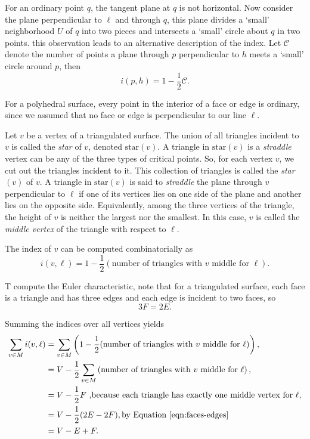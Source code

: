 For an ordinary point $q$, the tangent plane at $q$ is not horizontal. 
Now consider the plane perpendicular to $\ell$ and through $q$, this plane
divides a `small' neighborhood $U$ of $q$ into two pieces and intersects
a `small' circle about $q$ in two points.
this observation leads to an alternative description of the index.
Let $\mathcal{C}$ denote the number of points a plane through $p$ perpendicular
to $h$ meets a `small' circle around $p$, then 
$$i(p,h)=1-\frac{1}{2}\mathcal{C}.$$

For a  polyhedral surface, every point in the interior of a face or edge
is ordinary, since we assumed that no face or edge is perpendicular to our line $\ell.$

Let $v$ be a vertex of a triangulated surface.
The union of all triangles incident to $v$ is called the \emph{star} of $v$,
 denoted $\mathrm{star}(v).$ A triangle in $\mathrm{star}(v)$
 is a \emph{straddle}
 vertex can be any of the three types of critical points.
So, for each vertex $v$, we cut out the triangles incident to it. This collection of triangles
is called the \emph{star}$(v)$ of $v$. 
A triangle in $\mathrm{star}(v)$ is said to \emph{straddle} the plane through 
$v$ perpendicular to $\ell$ if one of its vertices lies on one side of the plane 
and another lies on the opposite side. Equivalently, among the three vertices 
of the triangle, the height of $v$ is neither the largest nor the smallest. 
In this case, $v$ is called the \emph{middle vertex} of the triangle with respect to $\ell$.

The index of $v$ can be computed combinatorially as
$$i(v,\ell)=1-\frac{1}{2} \left(\text{number of triangles with } v \text{ middle for } \ell\right).$$



T compute the Euler characteristic, note that for a triangulated surface, 
each face is a triangle and has three edges and each
edge is incident to two faces, so
\begin{equation} \label{eqn:faces-edges}
	3F=2E.
\end{equation}

Summing the indices over all vertices yields
\begin{align}
\sum_{v\in M}i(v,\ell) &=\sum_{v\in M} \left(1-\frac{1}{2}(\text{number of triangles with } v \text{ middle for } \ell)\right),  \\ \nonumber
       &=V - \frac{1}{2}\sum_{v\in M} \left(\text{number of triangles with } v \text{ middle for } \ell\right), \\ \nonumber
       &=V-\frac{1}{2} F \text{ ,because each triangle has exactly one middle vertex for  } \ell,\\ \nonumber
       &= V-\frac{1}{2}(2E-2F), \text{by \eqnref{faces-edges}}\\ \nonumber
       &=V-E+F. \nonumber 
\end{align}



